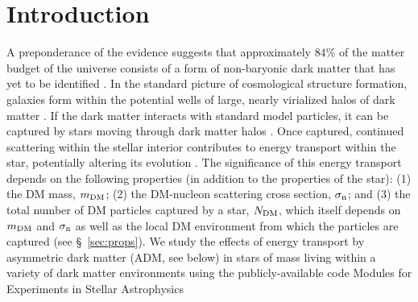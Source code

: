 \documentclass[useAMS,usenatbib]{mnras}
\begin{document}









\section{Introduction}
\label{sec:intro}

  A preponderance of the evidence suggests that approximately $84\%$ of the matter budget of the 
  universe consists of a form of non-baryonic dark matter that has yet to be identified 
  \citep[e.g.,][]{jungman_etal96,Bertone+05,CosmicVisions17,Profumo+19}. 
  In the standard picture of cosmological structure formation, 
  galaxies form within the potential wells of large, 
  nearly virialized halos of dark matter \citep{white_rees78,blumenthal_etal84}. 
  If the dark matter interacts with standard model particles, 
  it can be captured by stars moving through dark matter halos 
  \citep{press_spergel85,krauss_etal85,gaisser_etal86,griest_seckel87}. 
  Once captured, continued scattering within the stellar interior contributes 
  to energy transport within the star, potentially altering its evolution \citep{Spergel1985EffectInterior,Taoso+10,Zentner2011AsymmetricDwarfs,Iocco+12,Lopes_Silk12,Casanellas_Lopes13,Casanellas+15,vincent_etal15,Murase_Shoemaker16,Lopes_silk19,Vincent2020}. 
  The significance of this energy transport depends on the following 
  properties (in addition to the properties of the star): 
  (1) the DM mass, $m_{\mathrm{DM}}$; 
  (2) the DM-nucleon scattering cross section, $\sigma_{\mathrm{n}}$; 
  and (3) the total number of DM particles captured by a star, $N_{\mathrm{DM}}$, 
  which itself depends on $m_{\mathrm{DM}}$ and $\sigma_{\mathrm{n}}$ as well as the local DM environment from 
which the particles are captured (see \S~\ref{sec:props}). 
We study the effects of energy transport by asymmetric dark matter 
(ADM, see below)
in stars of mass \mrange living within a variety of dark matter 
environments using the publicly-available code 
Modules for Experiments in Stellar Astrophysics 
\citep[\mesa,][]{Paxton2011ModulesMESA, Paxton2013, Paxton2015, Paxton2018, Paxton2019}
\end{document}
